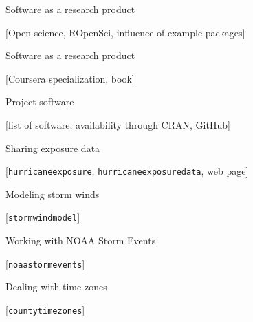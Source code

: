\documentclass[ignorenonframetext,]{beamer}
\begin{document}
\begin{frame}{Software as a research product}

{[}Open science, ROpenSci, influence of example packages{]}

\end{frame}

\begin{frame}{Software as a research product}

{[}Coursera specialization, book{]}

\end{frame}

\begin{frame}{Project software}

{[}list of software, availability through CRAN, GitHub{]}

\end{frame}

\begin{frame}[fragile]{Sharing exposure data}

{[}\texttt{hurricaneexposure}, \texttt{hurricaneexposuredata}, web
page{]}

\end{frame}

\begin{frame}[fragile]{Modeling storm winds}

{[}\texttt{stormwindmodel}{]}

\end{frame}

\begin{frame}[fragile]{Working with NOAA Storm Events}

{[}\texttt{noaastormevents}{]}

\end{frame}

\begin{frame}[fragile]{Dealing with time zones}

{[}\texttt{countytimezones}{]}

\end{frame}
\end{document}
